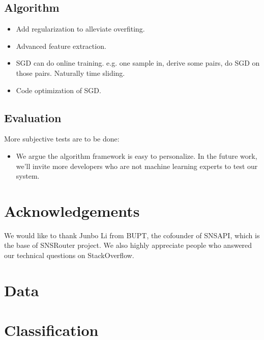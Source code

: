\documentclass{sig-alternate}
\begin{document}
\subsection{Algorithm}
\label{sec:fu_Algorithm}

\begin{itemize}
	\item Add regularization to alleviate overfiting. 
	\item Advanced feature extraction.
	\item SGD can do online training.
	e.g. one sample in, derive some pairs, do
	SGD on those pairs.
	Naturally time sliding.
	\item Code optimization of SGD. 
\end{itemize}

\subsection{Evaluation}
\label{sec:fu_Evaluation}

More subjective tests are to be done:

\begin{itemize}
	\item We argue the algorithm framework is easy to personalize. 
		In the future work, we'll invite more developers 
		who are not machine learning experts to test our system. 
\end{itemize}

\section*{Acknowledgements}
\label{sec:Acknowledgements}

We would like to thank Junbo Li from BUPT, 
the cofounder of SNSAPI, 
which is the base of SNSRouter project. 
We also highly appreciate people who answered our 
technical questions on StackOverflow. 




\appendix 

\section{Data}
\label{sec:Data}

\section{Classification}
\label{sec:app_Classification}
\end{document}
